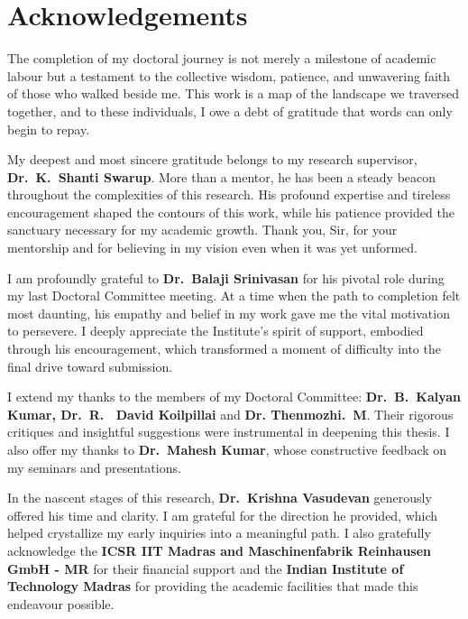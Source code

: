 \chapter{Acknowledgements}


The completion of my doctoral journey is not merely a milestone of academic labour but a testament to the collective wisdom, patience, and unwavering faith of those who walked beside me. This work is a map of the landscape we traversed together, and to these individuals, I owe a debt of gratitude that words can only begin to repay.

\vspace{1.5em}

\noindent My deepest and most sincere gratitude belongs to my research supervisor, \textbf{Dr.~K.~Shanti Swarup}. More than a mentor, he has been a steady beacon throughout the complexities of this research. His profound expertise and tireless encouragement shaped the contours of this work, while his patience provided the sanctuary necessary for my academic growth. Thank you, Sir, for your mentorship and for believing in my vision even when it was yet unformed.

\vspace{1em}

\noindent I am profoundly grateful to \textbf{Dr.~Balaji Srinivasan} for his pivotal role during my last Doctoral Committee meeting. At a time when the path to completion felt most daunting, his empathy and belief in my work gave me the vital motivation to persevere. I deeply appreciate the Institute’s spirit of support, embodied through his encouragement, which transformed a moment of difficulty into the final drive toward submission.

\vspace{1em}

\noindent I extend my thanks to the members of my Doctoral Committee: \textbf{Dr.~B.~Kalyan Kumar, Dr.~R.~ David Koilpillai}  and \textbf{Dr. Thenmozhi.~M}. Their rigorous critiques and insightful suggestions were instrumental in deepening this thesis. I also offer my thanks to \textbf{Dr.~Mahesh Kumar}, whose constructive feedback on my seminars and presentations. 

\vspace{1em}

\noindent In the nascent stages of this research, \textbf{Dr.~Krishna Vasudevan} generously offered his time and clarity. I am grateful for the direction he provided, which helped crystallize my early inquiries into a meaningful path.
\noindent I also gratefully acknowledge the \textbf{ICSR IIT Madras and  Maschinenfabrik Reinhausen GmbH - MR } for their financial support and the \textbf{Indian Institute of Technology Madras} for providing the academic facilities that made this endeavour possible.

